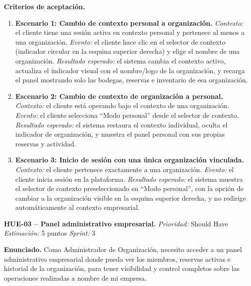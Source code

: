 \textbf{Criterios de aceptación.}
\begin{enumerate}
\item \textbf{Escenario 1: Cambio de contexto personal a organización.} \textit{Contexto:} el cliente tiene una sesión activa en contexto personal y pertenece al menos a una organización. \textit{Evento:} el cliente hace clic en el selector de contexto (indicador circular en la esquina superior derecha) y elige el nombre de una organización. \textit{Resultado esperado:} el sistema cambia el contexto activo, actualiza el indicador visual con el nombre/logo de la organización, y recarga el panel mostrando solo las bodegas, reservas e inventario de esa organización.
\item \textbf{Escenario 2: Cambio de contexto de organización a personal.} \textit{Contexto:} el cliente está operando bajo el contexto de una organización. \textit{Evento:} el cliente selecciona ``Modo personal'' desde el selector de contexto. \textit{Resultado esperado:} el sistema restaura el contexto individual, oculta el indicador de organización, y muestra el panel personal con sus propias reservas y actividad.
\item \textbf{Escenario 3: Inicio de sesión con una única organización vinculada.} \textit{Contexto:} el cliente pertenece exactamente a una organización. \textit{Evento:} el cliente inicia sesión en la plataforma. \textit{Resultado esperado:} el sistema muestra el selector de contexto preseleccionado en ``Modo personal'', con la opción de cambiar a la organización visible en la esquina superior derecha, y no redirige automáticamente al contexto empresarial.
\end{enumerate}

\textbf{HUE-03 -- Panel administrativo empresarial.} \label{req:HUE-03}
\textit{Prioridad:} Should Have \quad \textit{Estimación:} 5 puntos \quad \textit{Sprint:} 3

\textbf{Enunciado.} Como Administrador de Organización, necesito acceder a un panel administrativo empresarial donde pueda ver los miembros, reservas activas e historial de la organización, para tener visibilidad y control completos sobre las operaciones realizadas a nombre de mi empresa.

